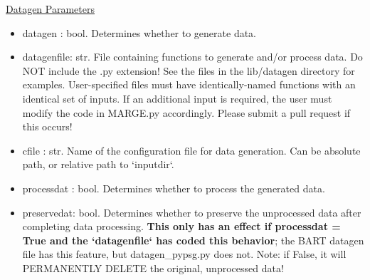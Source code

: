 \documentclass[letterpaper, 12pt]{article}
\begin{document}
\noindent \underline{Datagen Parameters}
\begin{itemize}
\item datagen    : bool. Determines whether to generate data.
\item datagenfile: str.  File containing functions to generate and/or process 
                         data.  Do NOT include the .py extension!
                         See the files in the lib/datagen directory for examples.
                         User-specified files must have identically-named 
                         functions with an identical set of inputs.  If an 
                         additional input is required, the user must modify the 
                         code in MARGE.py accordingly.  
                         Please submit a pull request if this occurs!
\item cfile      : str.  Name of the configuration file for data generation.
                         Can be absolute path, or relative path to `inputdir`.
\item processdat : bool. Determines whether to process the generated data.
\item preservedat: bool. Determines whether to preserve the unprocessed data after 
                   completing data processing.  \textbf{This only has an effect if processdat = True 
                   and the `datagenfile` has coded this behavior}; the BART datagen file has 
                   this feature, but datagen\_pypsg.py does not.
                   Note: if False, it will PERMANENTLY DELETE the original, 
                         unprocessed data!
\end{itemize}
\end{document}
